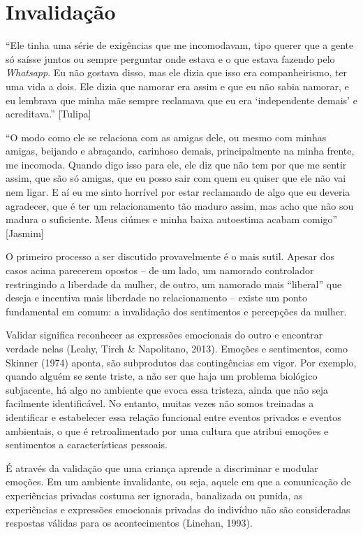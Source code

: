 \section*{Invalidação}

``Ele tinha uma série de exigências que me incomodavam, tipo querer que a gente só saísse juntos ou sempre perguntar onde estava e o que estava fazendo pelo \textit{Whatsapp}. Eu não gostava disso, mas ele dizia que isso era companheirismo, ter uma vida a dois. Ele dizia que namorar era assim e que eu não sabia namorar, e eu lembrava que minha mãe sempre reclamava que eu era ‘independente demais’ e acreditava.'' [Tulipa]

``O modo como ele se relaciona com as amigas dele, ou mesmo com minhas amigas, beijando e abraçando, carinhoso demais, principalmente na minha frente, me incomoda. Quando digo isso para ele, ele diz que não tem por que me sentir assim, que são só amigas, que eu posso sair com quem eu quiser que ele não vai nem ligar. E aí eu me sinto horrível por estar reclamando de algo que eu deveria agradecer, que é ter um relacionamento tão maduro assim, mas acho que não sou madura o suficiente. Meus ciúmes e minha baixa autoestima acabam comigo'' [Jasmim]

O primeiro processo a ser discutido provavelmente é o mais sutil. Apesar dos casos acima parecerem opostos – de um lado, um namorado controlador restringindo a liberdade da mulher, de outro, um namorado mais ``liberal'' que deseja e incentiva mais liberdade no relacionamento – existe um ponto fundamental em comum: a invalidação dos sentimentos e percepções da mulher.

Validar significa reconhecer as expressões emocionais do outro e encontrar verdade nelas (Leahy, Tirch \& Napolitano, 2013). Emoções e sentimentos, como Skinner (1974) aponta, são subprodutos das contingências em vigor. Por exemplo, quando alguém se sente triste, a não ser que haja um problema biológico subjacente, há algo no ambiente que evoca essa tristeza, ainda que não seja facilmente identificável. No entanto, muitas vezes não somos treinadas a identificar e estabelecer essa relação funcional entre eventos privados e eventos ambientais, o que é retroalimentado por uma cultura que atribui emoções e sentimentos a características pessoais.

É através da validação que uma criança aprende a discriminar e modular emoções. Em um ambiente invalidante, ou seja, aquele em que a comunicação de experiências privadas costuma ser ignorada, banalizada ou punida, as experiências e expressões emocionais privadas do indivíduo não são consideradas respostas válidas para os acontecimentos (Linehan, 1993).

